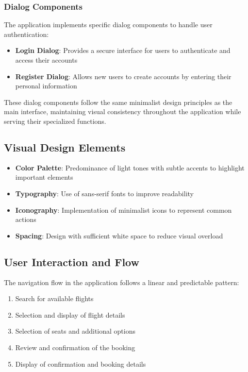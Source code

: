 \documentclass[conference]{IEEEtran}
\begin{document}
    \subsubsection{Dialog Components}
    The application implements specific dialog components to handle user authentication:

    \begin{itemize}
        \item \textbf{Login Dialog}: Provides a secure interface for users to authenticate and access their accounts
        \item \textbf{Register Dialog}: Allows new users to create accounts by entering their personal information
    \end{itemize}

    These dialog components follow the same minimalist design principles as the main interface, maintaining visual consistency throughout the application while serving their specialized functions.

    \subsection{Visual Design Elements}

    \begin{itemize}
        \item \textbf{Color Palette}: Predominance of light tones with subtle accents to highlight important elements
        \item \textbf{Typography}: Use of sans-serif fonts to improve readability
        \item \textbf{Iconography}: Implementation of minimalist icons to represent common actions
        \item \textbf{Spacing}: Design with sufficient white space to reduce visual overload
    \end{itemize}

    \subsection{User Interaction and Flow}
    The navigation flow in the application follows a linear and predictable pattern:

    \begin{enumerate}
        \item Search for available flights
        \item Selection and display of flight details
        \item Selection of seats and additional options
        \item Review and confirmation of the booking
        \item Display of confirmation and booking details
    \end{enumerate}
\end{document}
